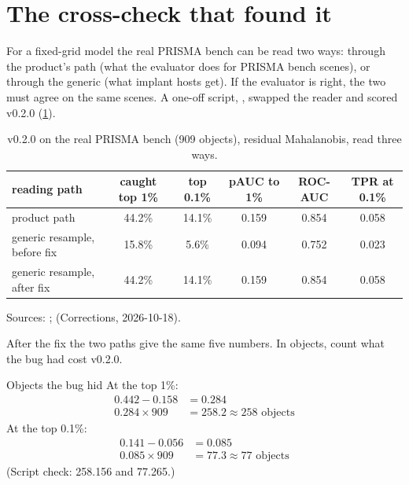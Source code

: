 \section{The cross-check that found it}\label{sec:sortbug:crosscheck}

For a fixed-grid model the real PRISMA bench can be read two ways: through the product's
 path (what the evaluator does for PRISMA bench scenes), or through the generic
 (what implant hosts get). If the evaluator is right, the two must agree on the same scenes. A
one-off script, , swapped the reader and scored v0.2.0
(\cref{tab:sortbug:crosscheck}).

\begin{table}[htbp]
\centering
\caption{v0.2.0 on the real PRISMA bench (909 objects), residual Mahalanobis, read three ways.}
\label{tab:sortbug:crosscheck}
\small
\begin{tabular}{lccccc}
\toprule
reading path & caught top 1\% & top 0.1\% & pAUC to 1\% & ROC-AUC & TPR at 0.1\% \\
\midrule
product path & 44.2\% & 14.1\% & 0.159 & 0.854 & 0.058 \\
generic resample, before fix & 15.8\% & 5.6\% & 0.094 & 0.752 & 0.023 \\
generic resample, after fix & 44.2\% & 14.1\% & 0.159 & 0.854 & 0.058 \\
\bottomrule
\end{tabular}

\smallskip
{\footnotesize Sources: ;  (Corrections, 2026-10-18).}
\end{table}

After the fix the two paths give the same five numbers. In objects, count what the bug had cost v0.2.0.

\begin{worked}[label={we:sortbug:objects}]{Objects the bug hid}
At the top 1\%:
\begin{align*}
0.442 - 0.158 &= 0.284\\
0.284 \times 909 &= 258.2 \approx 258 \text{ objects}
\end{align*}
At the top 0.1\%:
\begin{align*}
0.141 - 0.056 &= 0.085\\
0.085 \times 909 &= 77.3 \approx 77 \text{ objects}
\end{align*}
(Script check: 258.156 and 77.265\tagC.)
\end{worked}

